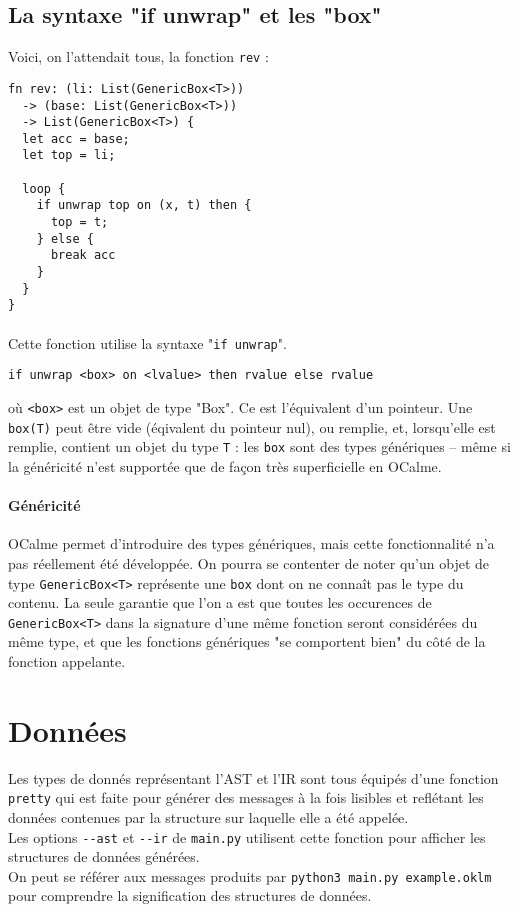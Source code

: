 \documentclass[french]{article}
\begin{document}
\subsection{La syntaxe "if unwrap" et les "box"}

Voici, on l'attendait tous, la fonction \verb|rev| :

\begin{lstlisting}
fn rev: (li: List(GenericBox<T>))
  -> (base: List(GenericBox<T>))
  -> List(GenericBox<T>) {
  let acc = base;
  let top = li;

  loop {
    if unwrap top on (x, t) then {
      top = t;
    } else {
      break acc
    }
  }
}
\end{lstlisting}

\paragraph{} Cette fonction utilise la syntaxe "\verb|if unwrap|". \\
\begin{lstlisting}
if unwrap <box> on <lvalue> then rvalue else rvalue
\end{lstlisting}
où \verb|<box>| est un objet de type "Box". Ce est l'équivalent d'un
pointeur. Une \verb|box(T)| peut être vide (éqivalent du pointeur nul),
ou remplie, et, lorsqu'elle est remplie, contient un objet du type
\verb|T| : les \verb|box| sont des types génériques -- même si
la généricité n'est supportée que de façon très superficielle en OCalme.

\paragraph{Généricité} OCalme permet d'introduire des types génériques,
mais cette fonctionnalité n'a pas réellement été développée. On pourra
se contenter de noter qu'un objet de type \verb|GenericBox<T>| représente
une \verb|box| dont on ne connaît pas le type du contenu. La seule
garantie que l'on a est que toutes les occurences de \verb|GenericBox<T>|
dans la signature d'une même fonction seront considérées du même type,
et que les fonctions génériques "se comportent bien" du côté de la
fonction appelante.

\section{Données}

Les types de donnés représentant l'AST et l'IR sont tous équipés d'une fonction
\verb|pretty| qui est faite pour générer des messages à la fois lisibles et
reflétant les données contenues par la structure sur laquelle elle a été
appelée. \\
Les options \verb|--ast| et \verb|--ir| de \verb|main.py| utilisent cette fonction pour
afficher les structures de données générées. \\
On peut se référer aux messages produits par
\verb|python3 main.py example.oklm|
pour comprendre la signification des structures de données.
\end{document}
